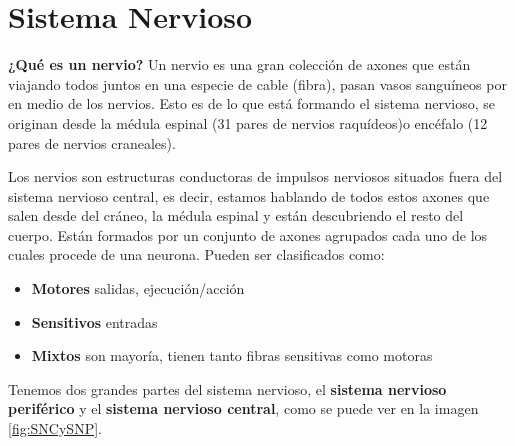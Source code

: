 \section{Sistema Nervioso}




\textbf{¿Qué es un nervio?}
Un nervio es una gran colección de axones que están viajando todos juntos en una especie de cable (fibra), pasan vasos sanguíneos por en medio de los nervios. Esto es de lo que está formando el sistema nervioso, se originan desde la médula espinal (31 pares de nervios raquídeos)o encéfalo (12 pares de nervios craneales).


Los nervios son estructuras conductoras de impulsos nerviosos situados fuera del sistema nervioso central, es decir, estamos hablando de todos estos axones que salen desde del cráneo, la médula espinal y están descubriendo el resto del cuerpo.
Están formados por un conjunto de axones agrupados cada uno de los cuales procede de una neurona. Pueden ser clasificados como:


\begin{itemize}
\item \textbf{Motores} salidas, ejecución/acción 
\item \textbf{Sensitivos} entradas 
\item \textbf{Mixtos} son mayoría, tienen tanto fibras sensitivas como motoras
\end{itemize}




Tenemos dos grandes partes del sistema nervioso, el \textbf{sistema nervioso periférico} y el \textbf{sistema nervioso central}, como se puede ver en la imagen \ref{fig:SNCySNP}. 


